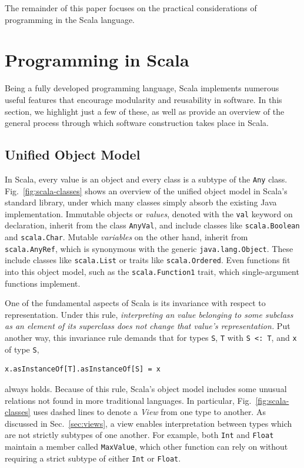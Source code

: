 \documentclass[jou,apacite]{IEEEtran}
\begin{document}

The remainder of this paper focuses on the practical considerations of
programming in the Scala language.

\section{Programming in Scala}
\label{sec:programming-scala}

Being a fully developed programming language, Scala implements numerous useful
features that encourage modularity and reusability in software. In this section,
we highlight just a few of these, as well as provide an overview of the general
process through which software construction takes place in Scala.

\subsection{Unified Object Model}
\label{sec:unified-object-model}

In Scala, every value is an object and every class is a subtype of the
\texttt{Any} class. Fig.~\ref{fig:scala-classes} shows an overview of the
unified object model in Scala's standard library, under which many classes
simply absorb the existing Java implementation. Immutable objects or
\emph{values}, denoted with the \texttt{val} keyword on declaration, inherit
from the class \texttt{AnyVal}, and include classes like \texttt{scala.Boolean}
and \texttt{scala.Char}. Mutable \emph{variables} on the other hand, inherit
from \texttt{scala.AnyRef}, which is synonymous with the generic
\texttt{java.lang.Object}. These include classes like \texttt{scala.List} or
traits like \texttt{scala.Ordered}. Even functions fit into this object model,
such as the \texttt{scala.Function1} trait, which single-argument functions
implement.

One of the fundamental aspects of Scala is its invariance with respect to
representation. Under this rule, \emph{interpreting an value belonging to some
  subclass as an element of its superclass does not change that value's
  representation.} Put another way, this invariance rule demands that for types
\texttt{S}, \texttt{T} with \texttt{S~<:~T}, and \texttt{x} of type \texttt{S},
\begin{verbatim}
x.asInstanceOf[T].asInstanceOf[S] = x
\end{verbatim}
always holds. Because of this rule, Scala's object model includes some unusual
relations not found in more traditional languages. In particular,
Fig.~\ref{fig:scala-classes} uses dashed lines to denote a \emph{View} from one
type to another. As discussed in Sec.~\ref{sec:views}, a view enables
interpretation between types which are not strictly subtypes of one
another. For example, both \texttt{Int} and \texttt{Float} maintain a member
called \texttt{MaxValue}, which other function can rely on without requiring
a strict subtype of either \texttt{Int} or \texttt{Float}.
\end{document}
